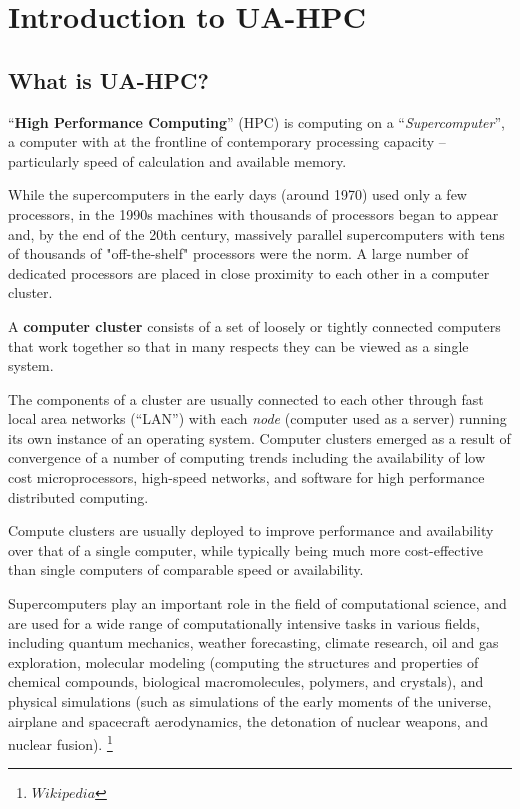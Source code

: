 \chapter{Introduction to UA-HPC}
\label{ch:introduction-to-hpc}

\section{What is UA-HPC?}
\label{sec:what-is-hpc}

``\textbf{High Performance Computing}'' (HPC) is computing on a
``\textit{Supercomputer}'', a computer with at the frontline of contemporary
processing capacity -- particularly speed of calculation and available memory.

While the supercomputers in the early days (around 1970) used only a few
processors, in the 1990s machines with thousands of processors began to appear
and, by the end of the 20th century, massively parallel supercomputers with
tens of thousands of "off-the-shelf" processors were the norm. A large number
of dedicated processors are placed in close proximity to each other in a
computer cluster.

A \textbf{computer cluster} consists of a set of loosely or tightly connected
computers that work together so that in many respects they can be viewed as a
single system.

The components of a cluster are usually connected to each other through fast
local area networks (``LAN'') with each \textit{node} (computer used as a
server) running its own instance of an operating system. Computer clusters
emerged as a result of convergence of a number of computing trends including
the availability of low cost microprocessors, high-speed networks, and software
for high performance distributed computing.

Compute clusters are usually deployed to improve performance and availability
over that of a single computer, while typically being much more cost-effective
than single computers of comparable speed or availability.

Supercomputers play an important role in the field of computational science,
and are used for a wide range of computationally intensive tasks in various
fields, including quantum mechanics, weather forecasting, climate research, oil
and gas exploration, molecular modeling (computing the structures and
properties of chemical compounds, biological macromolecules, polymers, and
crystals), and physical simulations (such as simulations of the early moments
of the universe, airplane and spacecraft aerodynamics, the detonation of
nuclear weapons, and nuclear fusion). \footnote{ $ Wikipedia$ }

